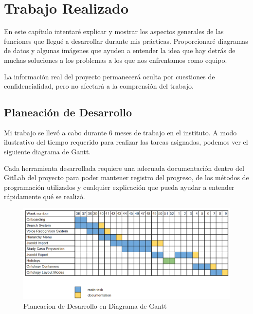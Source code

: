 \clearemptydoublepage
\chapter{Trabajo Realizado}

En este capítulo intentaré explicar y mostrar los aspectos generales de las funciones que llegué a desarrollar durante mis prácticas.
Proporcionaré diagramas de datos y algunas imágenes que ayuden a entender la idea que hay detrás de muchas soluciones a los problemas a los que nos enfrentamos como equipo.

La información real del proyecto permanecerá oculta por cuestiones de confidencialidad, pero no afectará a la comprensión del trabajo.

\section{Planeación de Desarrollo}

Mi trabajo se llevó a cabo durante 6 meses de trabajo en el instituto. A modo ilustrativo del tiempo requerido para realizar las tareas asignadas, podemos ver el siguiente diagrama de Gantt.

Cada herramienta desarrollada requiere una adecuada documentación dentro del GitLab del proyecto para poder mantener registro del progreso, de los métodos de programación utilizados y cualquier explicación que pueda ayudar a entender rápidamente qué se realizó.

\begin{figure}[ht]
    \begin{center}
       \includegraphics[width=1\linewidth]{chapter2/figures/gantt.png}
    \end{center}
    \caption[Planeacion de Desarrollo en Diagrama de Gantt]
    {\footnotesize Planeacion de Desarrollo en Diagrama de Gantt}
 \end{figure}

